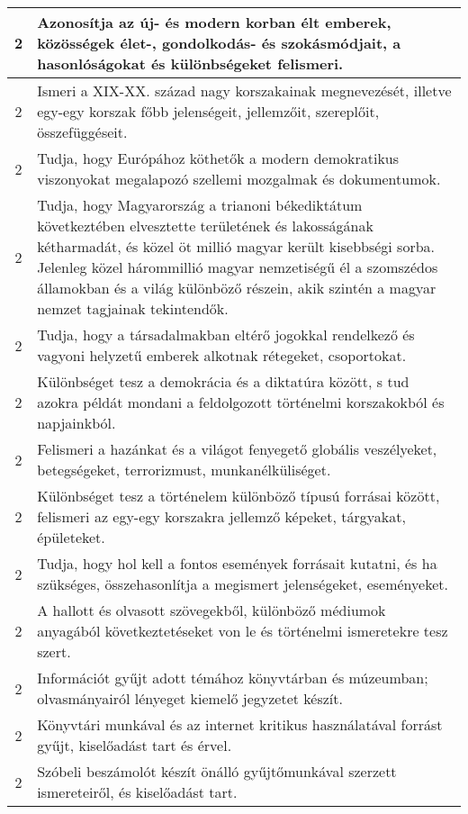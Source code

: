 \begin{longtable}{c | p{} }
                                
                                          2 &  Azonosítja az új- és modern korban élt emberek, közösségek élet-, gondolkodás- és szokásmódjait, a hasonlóságokat és különbségeket felismeri.
 \\ \hline
                                          2 &  Ismeri a XIX-XX. század nagy korszakainak megnevezését, illetve egy-egy korszak főbb jelenségeit, jellemzőit, szereplőit, összefüggéseit. \\ \hline
                                          2 &  Tudja, hogy Európához köthetők a modern demokratikus viszonyokat megalapozó szellemi mozgalmak és dokumentumok. \\ \hline
                                          2 &  Tudja, hogy Magyarország a trianoni békediktátum következtében elvesztette területének és lakosságának kétharmadát, és közel öt millió magyar került kisebbségi sorba. Jelenleg közel hárommillió magyar nemzetiségű él a szomszédos államokban és a világ különböző részein, akik szintén a magyar nemzet tagjainak tekintendők. \\ \hline
                                          2 &  Tudja, hogy a társadalmakban eltérő jogokkal rendelkező és vagyoni helyzetű emberek alkotnak rétegeket, csoportokat. \\ \hline
                                          2 &  Különbséget tesz a demokrácia és a diktatúra között, s tud azokra példát mondani a feldolgozott történelmi korszakokból és napjainkból. \\ \hline
                                          2 &  Felismeri a hazánkat és a világot fenyegető globális veszélyeket, betegségeket, terrorizmust, munkanélküliséget. \\ \hline
                                          2 &  Különbséget tesz a történelem különböző típusú forrásai között, felismeri az egy-egy korszakra jellemző képeket, tárgyakat, épületeket. \\ \hline
                                          2 &  Tudja, hogy hol kell a fontos események forrásait kutatni, és ha szükséges, összehasonlítja a megismert jelenségeket, eseményeket. \\ \hline
                                          2 &  A hallott és olvasott szövegekből, különböző médiumok anyagából következtetéseket von le és történelmi ismeretekre tesz szert. \\ \hline
                                          2 &  Információt gyűjt adott témához könyvtárban és múzeumban; olvasmányairól lényeget kiemelő jegyzetet készít. \\ \hline
                                          2 &  Könyvtári munkával és az internet kritikus használatával forrást gyűjt, kiselőadást tart és érvel. \\ \hline
                                          2 &  Szóbeli beszámolót készít önálló gyűjtőmunkával szerzett ismereteiről, és kiselőadást tart. \\ \hline
                                      

\end{longtable}
